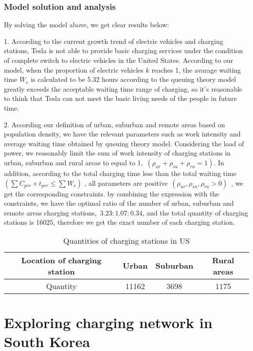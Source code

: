 \documentclass[12pt]{article}  %
\begin{document}
\subsubsection{Model solution and analysis}
By solving the model above, we get clear results below:

1. According to the current growth trend of electric vehicles and charging stations, Tesla is not able to provide basic charging services under the condition of complete switch to electric vehicles in the United States.
According to our model, when the proportion of electric vehicles ${k}$ reaches 1, the avarage waiting time ${W_s}$ is calculated to be 5.32 hours according to the queuing theory model greatly exceeds the acceptable waiting time range of charging, so it's reasonable to think that Tesla can not meet the basic living needs of the people in future time.

2. According our definition of urban, suburban and remote areas based on population density, we have the relevant parameters such as work intensity and average waiting time obtained by queuing theory model.
Considering the load of power, we reasonably limit the sum of work intensity of charging stations in urban, suburban and rural areas to  equal to 1,\ ${(\rho _{ur} + {\rho _{su}} + {\rho _{ru}} = 1)}$. In addition, according to the total charging time less than the total waiting time
${(\sum {{C_{per}}}  \times {t_{per}} \le \sum {{W_s}}) }$
, all parameters are positive\ ${({\rho _{ur}},{\rho _{su}},{\rho _{ru}} > 0)}$\ , we get the corresponding constraints.
by combining the expression with the constraints, we have the optimal ratio of the number of urban, suburban and remote areas charging stations,\ ${3.23:1.07:0.34 }$, and the total quantity of charging stations is 16025, therefore we get the exact number of each charging station.
\begin{table}[H]
\begin{center}
\caption{Quantities of charging stations in US}
\begin{tabular}{cccc}
	\toprule
	Location of charging station & Urban & Suburban & Rural areas\\
	\midrule
	Quantity & 11162 & 3698 & 1175\\
	\bottomrule
\end{tabular}\label{tb:2}
\end{center}
\end{table}

\section{Exploring charging network in South Korea}
\end{document}
